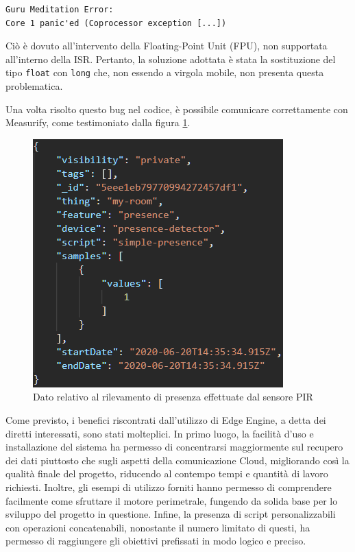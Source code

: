 \begin{verbatim}
Guru Meditation Error: 
Core 1 panic'ed (Coprocessor exception [...])
\end{verbatim}

Ciò è dovuto all'intervento della Floating-Point Unit (FPU), non supportata all'interno della ISR. Pertanto, la soluzione adottata è stata la sostituzione del tipo \texttt{float} con \texttt{long} che, non essendo a virgola mobile, non presenta questa problematica.

Una volta risolto questo bug nel codice, è possibile comunicare correttamente con Measurify, come testimoniato dalla figura \ref{measacquario}.

\begin{figure}[H]
	\centering
	\includegraphics[width=0.6\linewidth]{pics/measacquario}
	\caption{Dato relativo al rilevamento di presenza effettuate dal sensore PIR}
	\label{measacquario}
\end{figure}

Come previsto, i benefici riscontrati dall'utilizzo di Edge Engine, a detta dei diretti interessati, sono stati molteplici. In primo luogo, la facilità d'uso e installazione del sistema ha permesso di concentrarsi maggiormente sul recupero dei dati piuttosto che sugli aspetti della comunicazione Cloud, migliorando così la qualità finale del progetto, riducendo al contempo tempi e quantità di lavoro richiesti. Inoltre, gli esempi di utilizzo forniti hanno permesso di comprendere facilmente come sfruttare il motore perimetrale, fungendo da solida base per lo sviluppo del progetto in questione. Infine, la presenza di script personalizzabili con operazioni concatenabili, nonostante il numero limitato di questi, ha permesso di raggiungere gli obiettivi prefissati in modo logico e preciso.

